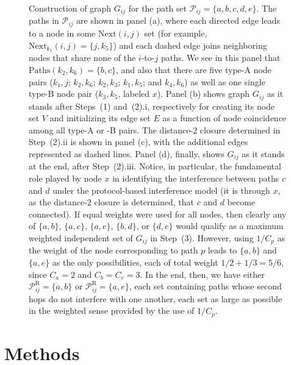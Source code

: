 \documentclass{article}
\begin{document}
\begin{figure}[p]
\centering
{}
\caption{Construction of graph $G_{ij}$ for the path set
$\mathcal{P}_{ij}=\{a,b,c,d,e\}$. The paths in $\mathcal{P}_{ij}$ are shown in
panel (a), where each directed edge leads to a node in some $\mathrm{Next}(i,j)$
set (for example, $\mathrm{Next}_{k_1}(i,j)=\{j,k_5\}$) and each dashed edge
joins neighboring nodes that share none of the $i$-to-$j$ paths. We see in this
panel that $\mathrm{Paths}(k_2,k_6)=\{b,c\}$, and also that there are five
type-A node pairs ($k_1,j$; $k_2,k_6$; $k_2,k_3$; $k_1,k_5$; and $k_4,k_6$) as
well as one single type-B node pair ($k_3,k_5$, labeled $x$). Panel (b) shows
graph $G_{ij}$ as it stands after Steps~(1) and~(2).i, respectively for creating
its node set $V$ and initializing its edge set $E$ as a function of node
coincidence among all type-A or -B pairs. The distance-$2$ closure determined in
Step~(2).ii is shown in panel (c), with the additional edges represented as
dashed lines. Panel (d), finally, shows $G_{ij}$ as it stands at the end, after
Step~(2).iii. Notice, in particular, the fundamental role played by node $x$ in
identifying the interference between paths $c$ and $d$ under the protocol-based
interference model (it is through $x$, as the distance-$2$ closure is
determined, that $c$ and $d$ become connected). If equal weights were used for
all nodes, then clearly any of $\{a,b\}$, $\{a,c\}$, $\{a,e\}$, $\{b,d\}$, or
$\{d,e\}$ would qualify as a maximum weighted independent set of $G_{ij}$ in
Step~(3). However, using $1/C_p$ as the weight of the node corresponding to path
$p$ leads to $\{a,b\}$ and $\{a,e\}$ as the only possibilities, each of total
weight $1/2+1/3=5/6$, since $C_a=2$ and $C_b=C_e=3$. In the end, then, we have
either
$\mathcal{P}^\mathrm{R}_{ij}=\{a,b\}$ or $\mathcal{P}^\mathrm{R}_{ij}=\{a,e\}$,
each set containing paths whose second hops do not interfere with one another,
each set as large as possible in the weighted sense provided by the use of
$1/C_p$.}
\label{figure1}
\end{figure}

\section{Methods}\label{sec:methods}
\end{document}
